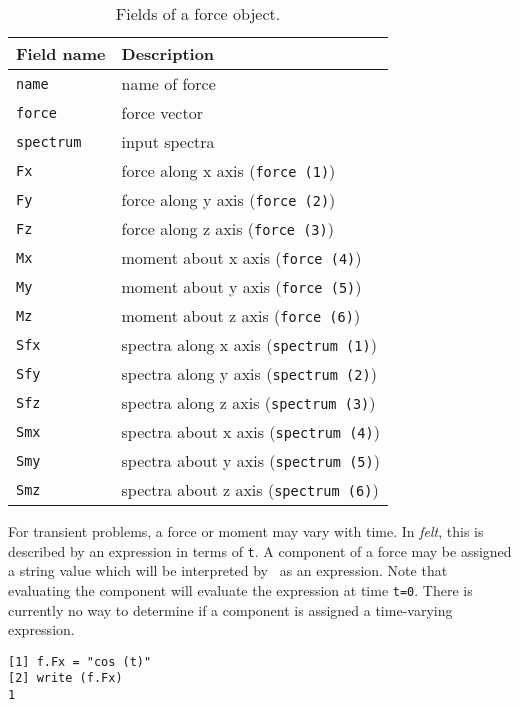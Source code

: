{\scriptsize
\begin{table}[htbp]
\begin{center}
\begin{tabular}{l|l}
Field name	& Description					\\
\hline
\tt name	& name of force					\\
\tt force	& force vector					\\
\tt spectrum	& input spectra					\\
\tt Fx		& force along x axis ({\tt force (1)})		\\
\tt Fy		& force along y axis ({\tt force (2)})		\\
\tt Fz		& force along z axis ({\tt force (3)})		\\
\tt Mx		& moment about x axis ({\tt force (4)})		\\
\tt My		& moment about y axis ({\tt force (5)})		\\
\tt Mz		& moment about z axis ({\tt force (6)})		\\
\tt Sfx		& spectra along x axis ({\tt spectrum (1)})	\\
\tt Sfy		& spectra along y axis ({\tt spectrum (2)})	\\
\tt Sfz		& spectra along z axis ({\tt spectrum (3)})	\\
\tt Smx		& spectra about x axis ({\tt spectrum (4)})	\\
\tt Smy		& spectra about y axis ({\tt spectrum (5)})	\\
\tt Smz		& spectra about z axis ({\tt spectrum (6)})	\\
\end{tabular}
\caption{Fields of a force object.}
\label{burlap.force.fields}
\end{center}
\end{table}}

For transient problems, a force or moment may vary with time.  In {\em
felt}, this is described by an expression in terms of {\tt t}.  A
component of a force may be assigned a string value which will be
interpreted by \burlap\ as an expression.  Note that evaluating the
component will evaluate the expression at time {\tt t=0}.  There is
currently no way to determine if a component is assigned a
time-varying expression.

\begin{screen}
\begin{verbatim}
[1] f.Fx = "cos (t)"
[2] write (f.Fx)
1
\end{verbatim}
\end{screen}



